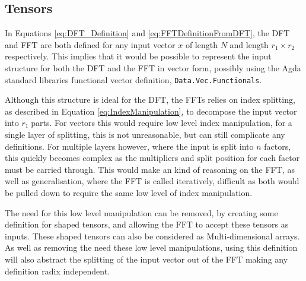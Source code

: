 \subsection{Tensors}
In Equations \ref{eq:DFT_Definition} and \ref{eq:FFTDefinitionFromDFT}, the DFT 
and FFT are both defined for any input vector $x$ of length $N$ and length 
$r_1\times r_2$ respectively. 
This implies that it would be possible to represent the input structure for both 
the DFT and the FFT in vector form, possibly using the Agda standard libraries functional
vector definition, \verb|Data.Vec.Functionals|.

Although this structure is ideal for the DFT, the FFTs relies on index splitting,
as described in Equation \ref{eq:IndexManipulation}, to decompose the input vector
into $r₁$ parts.
For vectors this would require low level index manipulation, for a single layer 
of splitting, this is not unreasonable, but can still complicate any definitions.
For multiple layers however, where the input is split into $n$ factors, this quickly
becomes complex as the multipliers and split position for each factor must be carried
through.
This would make an kind of reasoning on the FFT, as well as generalisation,
where the FFT is called iteratively, difficult as both would be
pulled down to require the same low level of index manipulation.

The need for this low level manipulation can be removed, by creating some
definition for shaped tensors, and allowing the FFT to 
accept these tensors as inputs.
These shaped tensors can also be considered as Multi-dimensional arrays.
As well as removing the need these low level manipulations, using this definition 
will also abstract the splitting of the input vector out of the FFT making any    %
definition radix independent.

